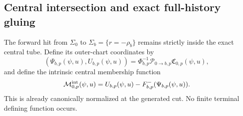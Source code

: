\subsection{Central intersection and exact full-history gluing}

The forward hit from \(\Sigma_0\) to \(\Sigma_b=\{r=-\rho_b\}\) remains
strictly inside the exact central tube.  Define its outer-chart coordinates
by
\begin{equation}
 (\Psi_{b,p}(\psi,u),U_{b,p}(\psi,u))
 =\Phi_{b,p}^{-1}\mathcal P_{0\to b,p}
       \mathfrak C_{0,p}(\psi,u),                  \label{eq:anchor-central-to-b-coordinates}
\end{equation}
and define the intrinsic central membership function
\begin{equation}
 \mathcal M_{0,p}^{\rm int}(\psi,u)
 =U_{b,p}(\psi,u)
   -F_{b,p}^-(\Psi_{b,p}(\psi,u)).                 \label{eq:anchor-central-intrinsic-membership}
\end{equation}
This is already canonically normalized at the generated cut.  No finite
terminal defining function occurs.

